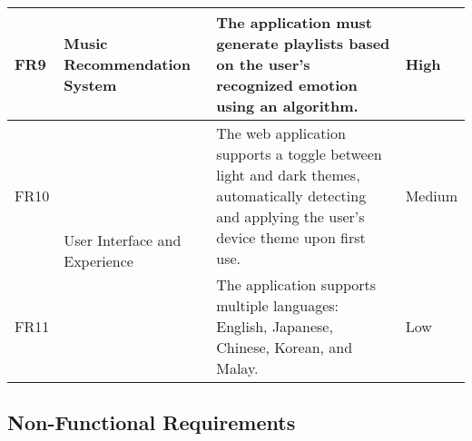 \begin{longtable}{ |m{1cm}|m{3.5cm}|m{7cm}|m{1.5cm}| }
    \hline
    FR9 & Music Recommendation System & The application must generate playlists based on the user's recognized emotion using an algorithm. & High \\
    \hline
    FR10 & \multirow{2}{=}{User Interface and Experience} & The web application supports a toggle between light and dark themes, automatically detecting and applying the user's device theme upon first use. & Medium \\
    \cline{1-1} \cline{3-4}
    FR11 &  & The application supports multiple languages: English, Japanese, Chinese, Korean, and Malay. & Low \\
    \hline
\end{longtable}
\pagebreak
\subsection{Non-Functional Requirements}
